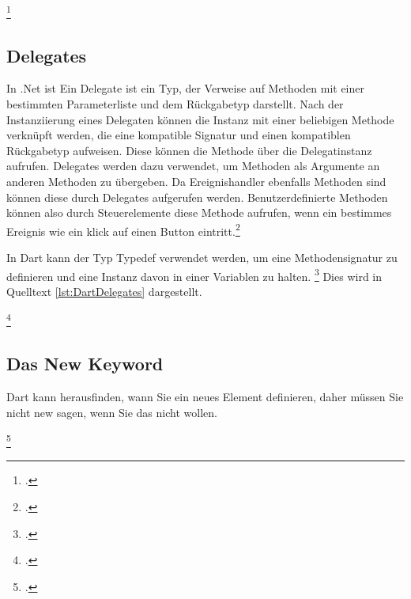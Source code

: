 \begin{minipage}{\linewidth}

\end{minipage}
\footcitetext[In Anlehnung an ][Abgerufen am \today]{Pedley2019}

\subsection{Delegates}

In .Net ist Ein Delegate ist ein Typ,  der Verweise auf Methoden mit einer bestimmten Parameterliste und dem Rückgabetyp darstellt.  Nach der Instanziierung eines Delegaten können die Instanz mit einer beliebigen Methode verknüpft werden,  die eine kompatible Signatur und einen kompatiblen Rückgabetyp aufweisen.  Diese können die Methode über die Delegatinstanz aufrufen.  Delegates werden dazu verwendet,  um Methoden als Argumente an anderen Methoden zu übergeben.  Da Ereignishandler ebenfalls Methoden sind können diese durch Delegates aufgerufen werden.  Benutzerdefinierte Methoden können also durch Steuerelemente diese Methode aufrufen, wenn ein bestimmes Ereignis wie ein klick auf einen Button eintritt.\footcite[Vgl.  ][Abgerufen am \today]{MicrosoftDelegates2015} 

In Dart kann der Typ Typedef verwendet werden, um eine Methodensignatur zu definieren und eine Instanz davon in einer Variablen zu halten. \footcite[Vgl. ][Abgerufen am \today]{Pedley2019}  Dies wird in Quelltext \ref{lst:DartDelegates} dargestellt. 


\begin{minipage}{\linewidth}

\end{minipage}
\footcitetext[In Anlehnung an ][Abgerufen am \today]{Pedley2019}

\subsection{Das New Keyword}


Dart kann herausfinden, wann Sie ein neues Element definieren, daher müssen Sie nicht new sagen, wenn Sie das nicht wollen.

\begin{minipage}{\linewidth}

\end{minipage}
\footcitetext[In Anlehnung an ][Abgerufen am \today]{Pedley2019}


